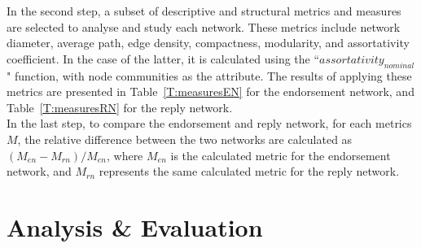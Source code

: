 \documentclass[journal,11pt]{IEEEtran}
\begin{document}
In the second step, a subset of descriptive and structural metrics and measures are selected to analyse and study each network. These metrics include network diameter, average path, edge density, compactness, modularity, and assortativity coefficient. In the case of the latter, it is calculated using the ``$assortativity_{nominal}$" function, with node communities as the attribute. The results of applying these metrics are presented in Table~\ref{T:measuresEN} for the endorsement network, and Table~\ref{T:measuresRN} for the reply network. \\

In the last step, to compare the endorsement and reply network, for each metrics $M$, the relative difference between the two networks are calculated as $(M_{en} - M_{rn}) / M_{en}$, where $M_{en}$ is the calculated metric for the endorsement network, and $M_{rn}$ represents the same calculated metric for the reply network.
\section{Analysis \& Evaluation}
\label{S:Anal}
\end{document}
